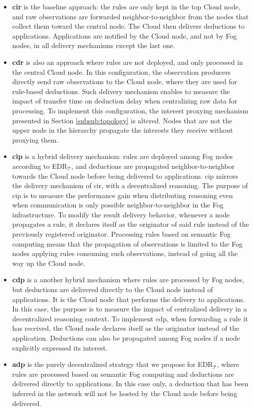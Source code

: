 \documentclass{iosart2c}
\newcommand{\edrt}{EDR$_{\mathcal{T}}$\xspace}
\begin{document}
\begin{itemize}
	\item \textbf{\gls{cir}} is the baseline approach: the rules are only kept in the top Cloud node, and raw observations are forwarded neighbor-to-neighbor from the nodes that collect them toward the central node. 
	The Cloud then delivers deductions to applications. 
	Applications are notified by the Cloud node, and not by Fog nodes, in all delivery mechanisms except the last one.
	
	\item \textbf{\gls{cdr}} is also an approach where rules are not deployed, and only processed in the central Cloud node. 
	In this configuration, the observation producers directly send raw observations to the Cloud node, where they are used for rule-based deductions.
	Such delivery mechanism enables to measure the impact of transfer time on deduction delay when centralizing raw data for processing.
	To implement this configuration, the interest proxying mechanism presented in Section \textsection \ref{subsub:topology} is altered. 
	Nodes that are not the upper node in the hierarchy propagate the interests they receive without proxying them.
	
	\item \textbf{\gls{cip}} is a hybrid delivery mechanism: rules are deployed among Fog nodes according to \edrt, and deductions are propagated neighbor-to-neighbor towards the Cloud node before being delivered to applications. 
	\gls{cip} mirrors the delivery mechanism of \gls{cir}, with a decentralized reasoning.
	The purpose of \gls{cip} is to measure the performance gain when distributing reasoning even when communication is only possible neighbor-to-neighbor in the Fog infrastructure.
	To modify the result delivery behavior, whenever a node propagates a rule, it declares itself as the originator of said rule instead of the previously registered originator.
	Processing rules based on semantic Fog computing means that the propagation of observations is limited to the Fog nodes applying rules consuming such observations, instead of going all the way up the Cloud node.
	
	\item \textbf{\gls{cdp}} is a another hybrid mechanism where rules are processed by Fog nodes, but deductions are delivered directly to the Cloud node instead of applications.
	It is the Cloud node that performs the delivery to applications.
	In this case, the purpose is to measure the impact of centralized delivery in a decentralized reasoning context.
	To implement \gls{cdp}, when forwarding a rule it has received, the Cloud node declares itself as the originator instead of the application.
	Deductions can also be propagated among Fog nodes if a node explicitly expressed its interest.
	
	\item \textbf{\gls{adp}} is the purely decentralized strategy that we propose for \edrt, where rules are processed based on semantic Fog computing and deductions are delivered directly to applications. 
	In this case only, a deduction that has been inferred in the network will not be hosted by the Cloud node before being delivered.
\end{itemize}
\end{document}
